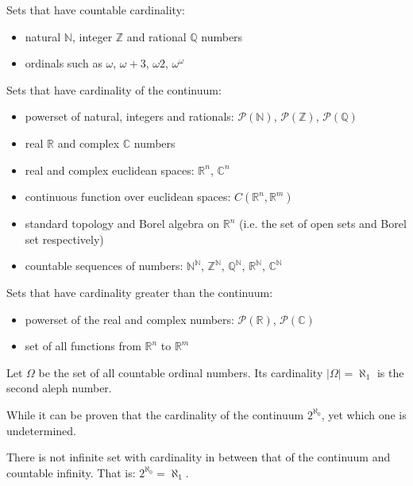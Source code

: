 \documentclass{article}
\newcommand{\marginleft}[1] {\reversemarginpar\marginpar{#1}}
\begin{document}
\begin{remark}
	Sets that have countable cardinality:
	\begin{itemize}
		\item natural $\mathbb{N}$, integer $\mathbb{Z}$ and rational $\mathbb{Q}$ numbers 
		\item ordinals such as $\omega$, $\omega + 3$, $\omega2$, $\omega^\omega$
	\end{itemize}
	Sets that have cardinality of the continuum:
	\begin{itemize}
		\item powerset of natural, integers and rationals: $\mathcal{P}(\mathbb{N})$, $\mathcal{P}(\mathbb{Z})$, $\mathcal{P}(\mathbb{Q})$
		\item real $\mathbb{R}$ and complex $\mathbb{C}$ numbers
		\item real and complex euclidean spaces: $\mathbb{R}^n$, $\mathbb{C}^n$
		\item continuous function over euclidean spaces: $C(\mathbb{R}^n, \mathbb{R}^m)$
		\item standard topology and Borel algebra on $\mathbb{R}^n$ (i.e. the set of open sets and Borel set respectively)
		\item countable sequences of numbers: $\mathbb{N}^\mathbb{N}$, $\mathbb{Z}^\mathbb{N}$, $\mathbb{Q}^\mathbb{N}$, $\mathbb{R}^\mathbb{N}$, $\mathbb{C}^\mathbb{N}$
	\end{itemize}
	Sets that have cardinality greater than the continuum:
	\begin{itemize}
		\item powerset of the real and complex numbers: $\mathcal{P}(\mathbb{R})$, $\mathcal{P}(\mathbb{C})$
		\item set of all functions from $\mathbb{R}^n$ to $\mathbb{R}^m$
	\end{itemize}
\end{remark}

\begin{defn}
	Let $\Omega$ \marginleft{$\aleph_1$} be the set of all countable ordinal numbers. Its cardinality $|\Omega| = \aleph_1$ is the second aleph number.
\end{defn}

\begin{remark}
	 While it can be proven that the cardinality of the continuum $2^{\aleph_0}$, yet which one is undetermined.
\end{remark}

\begin{axiom}
	There is \marginleft{Continuum hypothesis} not infinite set with cardinality in between that of the continuum and countable infinity. That is: $2^{\aleph_0} = \aleph_1$.
\end{axiom}
\end{document}
